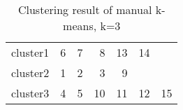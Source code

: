 \begin{table}[htbp]
  \centering
  \caption{Clustering result of manual k-means, k=3}
    \begin{tabular}{rrrrrrr}
    \toprule
    cluster1 & 6     & 7     & 8     & 13    & 14    &  \\
    cluster2 & 1     & 2     & 3     & 9     &       &  \\
    cluster3 & 4     & 5     & 10    & 11    & 12    & 15 \\
    \bottomrule
    \end{tabular}%
  \label{tab:cluster_b}%
\end{table}%
